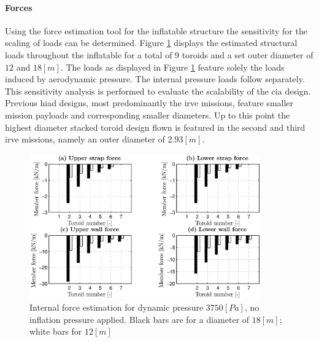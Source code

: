 \paragraph{Forces}

Using the force estimation tool for the inflatable structure the sensitivity for the scaling of loads can be determined. Figure \ref{fig:forces} displays the estimated structural loads throughout the inflatable for a total of 9 toroids and a set outer diameter of $12$ and $18 \left[m\right]$. The loads as displayed in Figure \ref{fig:forces} feature solely the loads induced by aerodynamic pressure. The internal pressure loads follow separately. This sensitivity analysis is performed to evaluate the scalability of the \gls{cia} design. Previous \gls{hiad} designs, most predominantly the \gls{irve} missions, feature smaller mission payloads and corresponding smaller diameters. Up to this point the highest diameter stacked toroid design flown is featured in the second and third \gls{irve} missions, namely an outer diameter of $2.93 \left[m\right]$. 

\begin{figure}[h]
	\centering
	\includegraphics[width=0.89\textwidth]{./Figure/Structure/forces_nopress_test.eps}
	\caption[{Internal force estimation for dynamic pressure $3750 \left[Pa\right]$, no inflation pressure applied}]{Internal force estimation for dynamic pressure $3750 \left[Pa\right]$, no inflation pressure applied. Black bars are for a diameter of $18 \left[m\right]$; white bars for $12 \left[m\right]$}
	\label{fig:forces}
\vspace{-4mm}
\end{figure}

